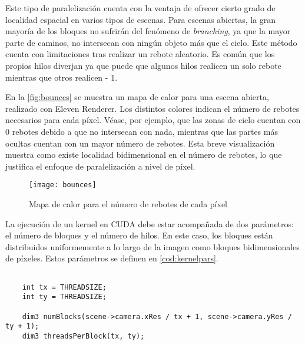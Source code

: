 Este tipo de paralelización cuenta con la ventaja de ofrecer cierto grado de localidad espacial en varios tipos de escenas. Para escenas abiertas, la gran mayoría de los bloques no sufrirán del fenómeno de \emph{branching}, ya que la mayor parte de caminos, no intersecan con ningún objeto más que el cielo. Este método cuenta con limitaciones tras realizar un rebote aleatorio. Es común que los propios hilos diverjan ya que puede que algunos hilos realicen un solo rebote mientras que otros realicen  - 1.

En la \autoref{fig:bounces} se muestra un mapa de calor para una escena abierta, realizado con Eleven Renderer. Los distintos colores indican el número de rebotes necesarios para cada píxel. Véase, por ejemplo, que las zonas de cielo cuentan con 0 rebotes debido a que no intersecan con nada, mientras que las partes más ocultas cuentan con un mayor número de rebotes. Esta breve visualización muestra como existe localidad bidimensional en el número de rebotes, lo que justifica el enfoque de paralelización a nivel de píxel.

\begin{figure}[H]
	\centering
	\texttt{[image: bounces]}
	
	\colorbox{red}{\strut \color{white}{0 bounces}}
	\colorbox{yellow}{\strut \color{black}{1 bounce}}
	\colorbox{green}{\strut \color{black}{2 bounces}}
	\colorbox{blue}{\strut \color{white}{3 bounces}}
	\colorbox{purple}{\strut \color{white}{4 bounces}}

	\caption{Mapa de calor para el número de rebotes de cada píxel}
	\label{fig:bounces}
\end{figure}

La ejecución de un kernel en CUDA debe estar acompañada de dos parámetros: el número de bloques y el número de hilos. En este caso, los bloques están distribuidos uniformemente a lo largo de la imagen como bloques bidimensionales de  píxeles. Estos parámetros se definen en \autoref{cod:kernelpars}.

\begin{minipage}[c]{0.95\textwidth}
\begin{lstlisting}[label={cod:kernelpars}, caption={Selección de parámetros para el kernel principal}]
	
    int tx = THREADSIZE;
    int ty = THREADSIZE;

    dim3 numBlocks(scene->camera.xRes / tx + 1, scene->camera.yRes / ty + 1);
    dim3 threadsPerBlock(tx, ty);
	
\end{lstlisting}
\end{minipage}

